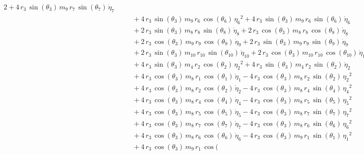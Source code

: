 \begin{eqnarray*}
2 + 4\,r_{3}\,\sin({\theta_{3}})\,m_{9}\,r_{7}\,\sin({\theta_{7}})\,{
\dot{\eta}_{7}} \\ &&\quad\mbox{} + 4\,r_{3}\,\sin({\theta_{3}})\,m_{9
}\,r_{6}\,\cos({\theta_{6}})\,{{\eta_{6}}}^2 + 4\,r_{3}\,\sin({\theta
_{3}})\,m_{9}\,r_{6}\,\sin({\theta_{6}})\,{\dot{\eta}_{6}}
 \\ &&\quad\mbox{} + 2\,r_{3}\,\sin({\theta_{3}})\,m_{8}\,r_{8}\,\sin(
{\theta_{8}})\,{\dot{\eta}_{8}} + 2\,r_{3}\,\cos({\theta_{3}})\,m_{8}
\,r_{8}\,\cos({\theta_{8}})\,{\dot{\eta}_{8}} \\ &&\quad\mbox{} + 2\,r
_{3}\,\cos({\theta_{3}})\,m_{9}\,r_{9}\,\cos({\theta_{9}})\,{
\dot{\eta}_{9}} + 2\,r_{3}\,\sin({\theta_{3}})\,m_{9}\,r_{9}\,\sin({
\theta_{9}})\,{\dot{\eta}_{9}} \\ &&\quad\mbox{} + 2\,r_{3}\,\sin({
\theta_{3}})\,m_{10}\,r_{10}\,\sin({\theta_{10}})\,{\dot{\eta}_{10}}
 + 2\,r_{3}\,\cos({\theta_{3}})\,m_{10}\,r_{10}\,\cos({\theta_{10}})\,
{\dot{\eta}_{10}} \\ &&\quad\mbox{} + 4\,r_{3}\,\sin({\theta_{3}})\,m
_{4}\,r_{2}\,\cos({\theta_{2}})\,{{\eta_{2}}}^2 + 4\,r_{3}\,\sin({
\theta_{3}})\,m_{4}\,r_{2}\,\sin({\theta_{2}})\,{\dot{\eta}_{2}}
 \\ &&\quad\mbox{} + 4\,r_{3}\,\cos({\theta_{3}})\,m_{8}\,r_{1}\,\cos(
{\theta_{1}})\,{\dot{\eta}_{1}} - 4\,r_{3}\,\cos({\theta_{3}})\,m_{8}
\,r_{2}\,\sin({\theta_{2}})\,{{\eta_{2}}}^2 \\ &&\quad\mbox{} + 4\,r_{
3}\,\cos({\theta_{3}})\,m_{8}\,r_{2}\,\cos({\theta_{2}})\,{\dot{\eta}
_{2}} - 4\,r_{3}\,\cos({\theta_{3}})\,m_{8}\,r_{4}\,\sin({\theta_{4}})
\,{{\eta_{4}}}^2 \\ &&\quad\mbox{} + 4\,r_{3}\,\cos({\theta_{3}})\,m_{
8}\,r_{4}\,\cos({\theta_{4}})\,{\dot{\eta}_{4}} - 4\,r_{3}\,\cos({
\theta_{3}})\,m_{8}\,r_{5}\,\sin({\theta_{5}})\,{{\eta_{5}}}^2
 \\ &&\quad\mbox{} + 4\,r_{3}\,\cos({\theta_{3}})\,m_{8}\,r_{5}\,\cos(
{\theta_{5}})\,{\dot{\eta}_{5}} - 4\,r_{3}\,\cos({\theta_{3}})\,m_{8}
\,r_{7}\,\sin({\theta_{7}})\,{{\eta_{7}}}^2 \\ &&\quad\mbox{} + 4\,r_{
3}\,\cos({\theta_{3}})\,m_{8}\,r_{7}\,\cos({\theta_{7}})\,{\dot{\eta}
_{7}} - 4\,r_{3}\,\cos({\theta_{3}})\,m_{8}\,r_{6}\,\sin({\theta_{6}})
\,{{\eta_{6}}}^2 \\ &&\quad\mbox{} + 4\,r_{3}\,\cos({\theta_{3}})\,m_{
8}\,r_{6}\,\cos({\theta_{6}})\,{\dot{\eta}_{6}} - 4\,r_{3}\,\cos({
\theta_{3}})\,m_{9}\,r_{1}\,\sin({\theta_{1}})\,{{\eta_{1}}}^2
 \\ &&\quad\mbox{} + 4\,r_{3}\,\cos({\theta_{3}})\,m_{9}\,r_{1}\,\cos(

\end{eqnarray*}
